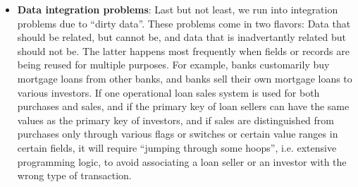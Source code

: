 \documentclass[10pt,a4paper]{article}
\begin{document}
\begin{itemize}
	\item \textbf{Data integration problems}: Last but not least, we run into integration problems due to “dirty data”. These problems come in two flavors: Data that should be related, but cannot be, and data that is inadvertantly related but should not be. The latter happens most frequently when fields or records are being reused for multiple purposes. For example, banks customarily buy mortgage loans from other banks, and banks sell their own mortgage loans to various investors. If one operational loan sales system is used for both purchases and sales, and if the primary key of loan sellers can have the same values as the primary key of investors, and if sales are distinguished from purchases only through various flags or switches or certain value ranges in certain fields, it will require “jumping through some hoops”, i.e. extensive programming logic, to avoid associating a loan seller or an investor with the wrong type of transaction.
\end{itemize}
\end{document}
